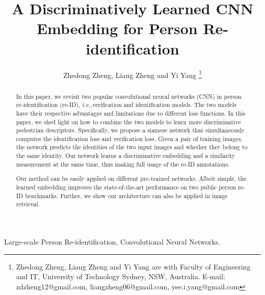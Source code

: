 \documentclass[journal]{IEEEtran}
\newcommand{\ie}{\mbox{\emph{i.e.,}}}
\begin{document}
\title{A Discriminatively Learned CNN Embedding for Person Re-identification}

\author{Zhedong Zheng, Liang Zheng and Yi Yang \thanks{Zhedong Zheng, Liang Zheng and Yi Yang are with Faculty of Engineering and IT, University of Technology Sydney, NSW, Australia. E-mail: zdzheng12@gmail.com, liangzheng06@gmail.com, yee.i.yang@gmail.com}}















\maketitle

\begin{abstract}
In this paper, we revisit two popular convolutional neural networks (CNN) in person re-identification (re-ID), \ie verification and identification models. The two models have their respective advantages and limitations due to different loss functions. In this paper, we shed light on how to combine the two models to learn more discriminative pedestrian descriptors. Specifically, we propose a siamese network that simultaneously computes the identification loss and verification loss. Given a pair of training images, the network predicts the identities of the two input images and whether they belong to the same identity. Our network learns a discriminative embedding and a similarity measurement at the same time, thus making full usage of the re-ID annotations. 

Our method can be easily applied on different pre-trained networks. Albeit simple, the learned embedding improves the state-of-the-art performance on two public person re-ID benchmarks. Further, we show our architecture can also be applied in image retrieval.
\end{abstract}

\begin{IEEEkeywords}
Large-scale Person Re-identification, Convolutional Neural Networks.
\end{IEEEkeywords}
\end{document}
